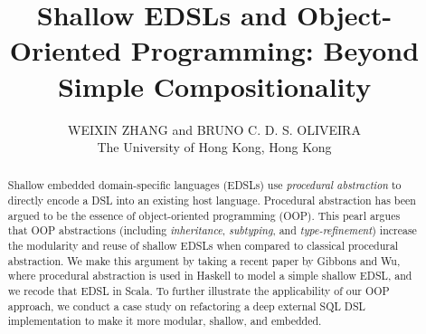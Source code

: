 \documentclass{jfp1}
\newcommand{\an}[3]{{\color{#2} {\sc #1}:#3}}
\newcommand{\bruno}[1]{\an{bruno}{blue}{#1}}
\begin{document}
\title{Shallow EDSLs and Object-Oriented Programming: Beyond Simple Compositionality}

\author[W. Zhang and B. Oliveira]
        {WEIXIN ZHANG and BRUNO C. D. S. OLIVEIRA\\
         The University of Hong Kong, Hong Kong}

\maketitle[f]

\begin{abstract}
Shallow embedded domain-specific languages (EDSLs) use
\emph{procedural abstraction} to directly encode a DSL into an existing host language. Procedural abstraction has
been argued to be the essence of object-oriented programming (OOP).
This pearl argues that OOP abstractions
(including \emph{inheritance}, \emph{subtyping}, and
\emph{type-refinement})
increase the modularity and reuse of shallow
EDSLs when compared to classical procedural abstraction. We make this
argument by taking a recent paper by Gibbons and Wu, where procedural
abstraction is used in Haskell to model a simple shallow EDSL, and we recode
that EDSL in Scala. 
To further illustrate the applicability of our OOP approach, we conduct
a case study on refactoring a deep external SQL DSL implementation to make it
more modular, shallow, and embedded.
\end{abstract}















\end{document}
